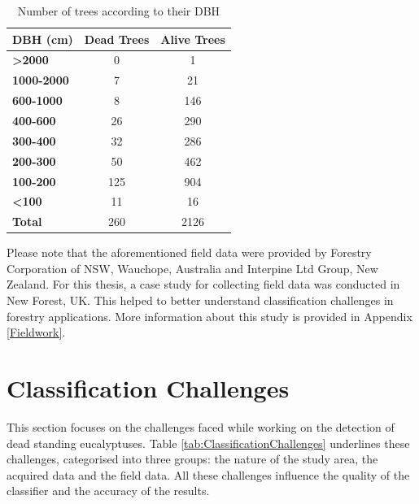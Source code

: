 \documentclass{subfiles}
\begin{document}
\begin{table}[!h]
	\centering
	\begin{tabular}{| l || c | c | }
		\hline		
		\textbf{DBH (cm)} &\textbf{Dead Trees} & \textbf{Alive Trees }\\	
		\hline			
		\hline			
		\textbf{>2000} & 0 & 1\\
		\hline			
		\textbf{1000-2000} & 7 & 21\\
		\hline			
		\textbf{600-1000} & 8 & 146\\
		\hline			
		\textbf{400-600} & 26 & 290\\
		\hline			
		\textbf{300-400} & 32 & 286\\
		\hline			
		\textbf{200-300} & 50 & 462\\
		\hline			
		\textbf{100-200} &125 & 904\\
		\hline			
		\textbf{<100} & 11 & 16\\
		\hline			
		\textbf{Total} & 260 & 2126 \\
		\hline  
	\end{tabular}
	\caption{Number of trees according to their DBH}
\end{table}

\par Please note that the aforementioned field data were provided by Forestry Corporation of NSW, Wauchope, Australia and Interpine Ltd Group, New Zealand. For this thesis, a case study for collecting field data was conducted in New Forest, UK. This helped to better understand classification challenges in forestry applications. More information about this study is provided in Appendix \ref{Fieldwork}.



\section{Classification Challenges}\label{sec:ClassficationChallenges}
\par This section focuses on the challenges faced while working on the detection of dead standing eucalyptuses. Table \ref{tab:ClassificationChallenges} underlines these challenges, categorised into three groups: the nature of the study area, the acquired data and the field data. All these challenges influence the quality of the classifier and the accuracy of the results. 
\end{document}
